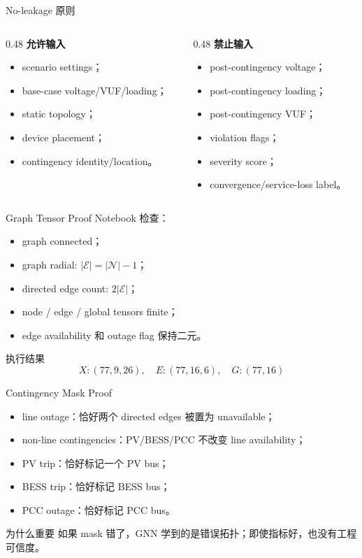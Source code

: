 \documentclass[aspectratio=169,11pt]{beamer}
\begin{document}
\begin{frame}{No-leakage 原则}
\begin{columns}
\begin{column}{0.48\textwidth}
\textbf{允许输入}
\begin{itemize}
  \item scenario settings；
  \item base-case voltage/VUF/loading；
  \item static topology；
  \item device placement；
  \item contingency identity/location。
\end{itemize}
\end{column}
\begin{column}{0.48\textwidth}
\textbf{禁止输入}
\begin{itemize}
  \item post-contingency voltage；
  \item post-contingency loading；
  \item post-contingency VUF；
  \item violation flags；
  \item severity score；
  \item convergence/service-loss label。
\end{itemize}
\end{column}
\end{columns}
\end{frame}

\begin{frame}{Graph Tensor Proof}
Notebook 检查：
\begin{itemize}
  \item graph connected；
  \item graph radial: $|\mathcal E|=|\mathcal N|-1$；
  \item directed edge count: $2|\mathcal E|$；
  \item node / edge / global tensors finite；
  \item edge availability 和 outage flag 保持二元。
\end{itemize}
\begin{exampleblock}{执行结果}
\[
X: (77,9,26),\quad E:(77,16,6),\quad G:(77,16)
\]
\end{exampleblock}
\end{frame}

\begin{frame}{Contingency Mask Proof}
\begin{itemize}
  \item line outage：恰好两个 directed edges 被置为 unavailable；
  \item non-line contingencies：PV/BESS/PCC 不改变 line availability；
  \item PV trip：恰好标记一个 PV bus；
  \item BESS trip：恰好标记 BESS bus；
  \item PCC outage：恰好标记 PCC bus。
\end{itemize}
\begin{block}{为什么重要}
如果 mask 错了，GNN 学到的是错误拓扑；即使指标好，也没有工程可信度。
\end{block}
\end{frame}
\end{document}
